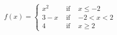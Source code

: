 {${\displaystyle f(x) = \left\{ \begin{array}{rcl} x^{2} & \mbox{ if } & x \leq -2 \\
                                                        3 - x & \mbox{ if } & -2 < x < 2 \\
                                                            4 & \mbox{ if } & x \geq 2  
                                     \end{array} \right. }$}
{
\begin{center}
\end{center}
}